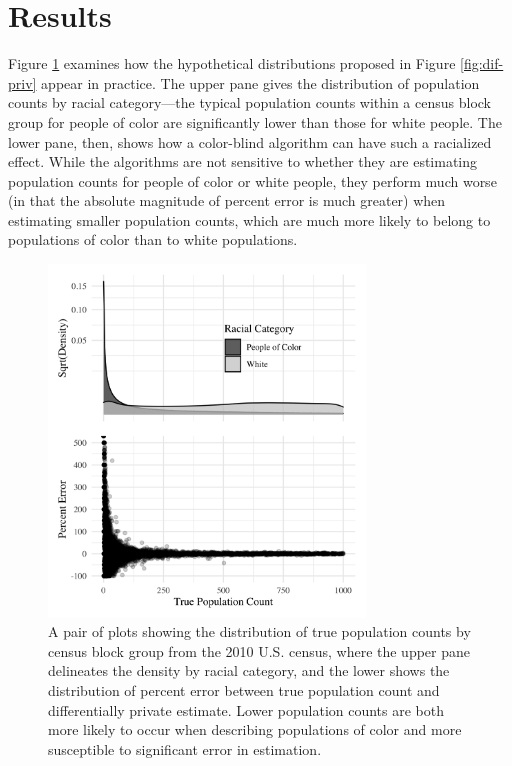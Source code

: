\section{Results}\label{sec:results}


Figure \ref{fig:error-true-pop} examines how the hypothetical distributions proposed in Figure \ref{fig:dif-priv} appear in practice. The upper pane gives the distribution of population counts by racial category---the typical population counts within a census block group for people of color are significantly lower than those for white people. The lower pane, then, shows how a color-blind algorithm can have such a racialized effect. While the algorithms are not sensitive to whether they are estimating population counts for people of color or white people, they perform much worse (in that the absolute magnitude of percent error is much greater) when estimating smaller population counts, which are much more likely to belong to populations of color than to white populations.

\begin{figure}
   \centering
   \includegraphics[width=0.75\textwidth]{figures/error_by_true_pop.png}
   \caption{A pair of plots showing the distribution of true population counts by census block group from the 2010 U.S. census, where the upper pane delineates the density by racial category, and the lower shows the distribution of percent error between true population count and differentially private estimate. Lower population counts are both more likely to occur when describing populations of color and more susceptible to significant error in estimation.}
   \label{fig:error-true-pop}
\end{figure}

